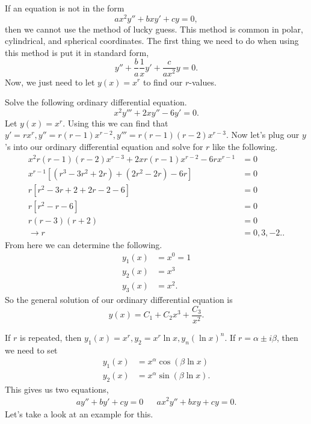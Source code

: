 If an equation is not in the form 
\[
ax^2y'' + bxy'+cy=0
,\] then we cannot use the method of lucky guess. This method is common in polar, cylindrical, and spherical coordinates. The first thing we need to do when using this method is put it in standard form,
\[
y''+\frac{b}{a}\frac{1}{x}y'+\frac{c}{ax^2}y=0
.\] 
Now, we just need to let $y(x)=x^{r}$ to find our $r$-values.
\begin{eg}
  Solve the following ordinary differential equation.
  \[
  x^2y'''+2xy''-6y'=0
  .\] 
  Let $y(x)=x^{r}$. Using this we can find that $y'=rx^{r}, y''=r(r-1)x^{r-2},y'''=r(r-1)(r-2)x^{r-3}$. Now let's plug our $y$'s into our ordinary differential equation and solve for $r$ like the following.
  \begin{align*}
    x^2r(r-1)(r-2)x^{r-3}+2xr(r-1)x^{r-2}-6rx^{r-1}&=0\\
    x^{r-1}\left[ \left( r^{3}-3r^2+2r \right) + \left( 2r^2-2r \right) -6r  \right]&=0\\
    r\left[ r^2-3r+2+2r-2-6 \right] &=0\\
    r\left[ r^2-r-6 \right]&=0\\
    r(r-3)(r+2)&=0\\
    \to r&=0,3,-2.
  .\end{align*}
  From here we can determine the following.
  \begin{align*}
    y_1(x)&=x^{0}=1\\
    y_2(x)&=x^{3}\\
    y_3(x)&=x^{2}
  .\end{align*}
  So the general solution of our ordinary differential equation is 
  \[
    y(x)=C_1+C_2x^{3}+\frac{C_3}{x^2} 
  .\] 
\end{eg}
  If $r$ is repeated, then $y_1(x)=x^{r},y_2=x^{r}\ln x,y_{n}(\ln x)^n$. If $r=\alpha\pm i\beta$, then we need to set 
  \begin{align*}
    y_1(x)&=x^{\alpha}\cos(\beta\ln x)\\
    y_2(x)&=x^{\alpha}\sin(\beta\ln x)
  .\end{align*}
  This gives us two equations,
  \begin{align*}
    ay''+by'+cy=0 && ax^2y''+bxy+cy=0
  .\end{align*}
  Let's take a look at an example for this.
